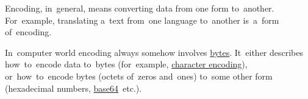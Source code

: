 \label{encoding}
Encoding, in~general, means converting data from one form to~another.
For~example, translating a~text from~one language to~another is~a~form of~encoding.

In~computer world encoding always somehow involves \hyperref[bitsbytes]{bytes}.
It~either describes how~to~encode data to~bytes (for~example, \hyperref[charactersetencoding]{character encoding}), or~how~to~encode bytes (octets of~zeros and~ones) to~some other form (hexadecimal numbers, \hyperref[base64]{base64}~etc.).
